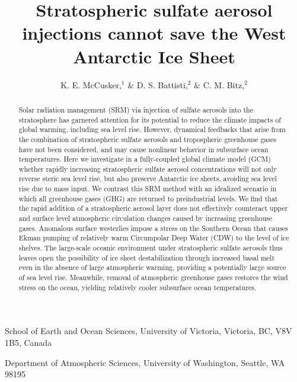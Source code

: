 \documentclass{nature}
\title{Stratospheric sulfate aerosol injections cannot save the West Antarctic Ice Sheet} %
\author{K. E. McCusker,$^{1}$ \& D. S. Battisti,$^{2}$ \& C. M. Bitz,$^2$}
\begin{document}
\maketitle

\begin{affiliations}
 \item School of Earth and Ocean Sciences, University of Victoria, Victoria, BC, V8V 1B5, Canada
 \item Department of Atmospheric Sciences, University of Washington, Seattle, WA 98195
\end{affiliations}


\begin{abstract}
Solar radiation management (SRM) via injection of sulfate aerosols into the stratosphere has garnered attention for its potential to reduce the climate impacts of global warming, including sea level rise. However, dynamical feedbacks that arise from the combination of stratospheric sulfate aerosols and tropospheric greenhouse gases have not been considered, and may cause nonlinear behavior in subsurface ocean temperatures. Here we investigate in a fully-coupled global climate model (GCM) whether rapidly increasing stratospheric sulfate aerosol concentrations will not only reverse steric sea level rise, but also preserve Antarctic ice sheets, avoiding sea level rise due to mass input. We contrast this SRM method with an idealized scenario in which all greenhouse gases (GHG) are returned to preindustrial levels. We find that the rapid addition of a stratospheric aerosol layer does not effectively counteract upper and surface level atmospheric circulation changes caused by increasing greenhouse gases. Anomalous surface westerlies impose a stress on the Southern Ocean that causes Ekman pumping of relatively warm Circumpolar Deep Water (CDW) to the level of ice shelves. The large-scale oceanic environment under stratospheric sulfate aerosols thus leaves open the possibility of ice sheet destabilization through increased basal melt even in the absence of large atmospheric warming, providing a potentially large source of sea level rise. Meanwhile, removal of atmospheric greenhouse gases restores the wind stress on the ocean, yielding relatively cooler subsurface ocean temperatures. 

\end{abstract}



\end{document}
